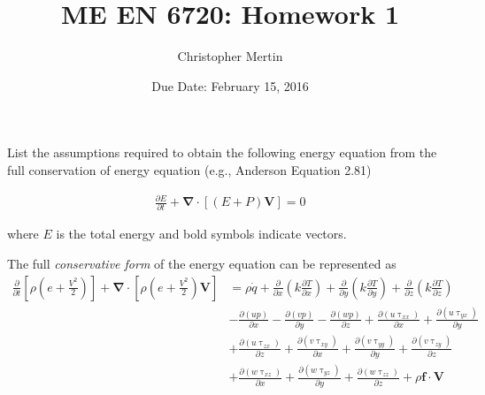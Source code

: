 \documentclass[addpoints]{exam}
\title{ME EN 6720: Homework 1}
\date{Due Date: February 15, 2016}
\author{Christopher Mertin}
\begin{document}
\maketitle

\pointname{}
\bonuspointname{}
\pointformat{[\bfseries\thepoints]}

\printanswers



\begin{questions}

List the assumptions required to obtain the following energy equation from the full conservation of energy equation (e.g., Anderson Equation 2.81)

\begin{align}
\frac{\partial E}{\partial t} + \bm{\nabla}\cdot [(E+P)\mathbf{V}] = 0\label{eq:simple}
\end{align}

where $E$ is the total energy and bold symbols indicate vectors.
\begin{solution}
The full {\em conservative form} of the energy equation can be represented as
\begin{align}
\frac{\partial}{\partial t}\left[\rho\left(e+\frac{V^{2}}{2}\right)\right]+\bm{\nabla}\cdot\left[\rho\left( e+\frac{V^{2}}{2}\right)\mathbf{V}\right] &= \rho\dot{q}+\frac{\partial}{\partial x}\left(k\frac{\partial T}{\partial x}\right)+\frac{\partial}{\partial y}\left( k\frac{\partial T}{\partial y}\right)+ \frac{\partial}{\partial z}\left( k\frac{\partial T}{\partial z}\right)\nonumber\\
&-\frac{\partial (up)}{\partial x}-\frac{\partial (vp)}{\partial y}-\frac{\partial (wp)}{\partial z}+\frac{\partial (u\uptau_{xx})}{\partial x}+\frac{\partial (u\uptau_{yx})}{\partial y}\nonumber\\
&+\frac{\partial (u\uptau_{zx})}{\partial z}+\frac{\partial (v\uptau_{xy})}{\partial x} +\frac{\partial (v\uptau_{yy})}{\partial y}+\frac{\partial (v\uptau_{zy})}{\partial z}\nonumber\\
&+\frac{\partial (w\uptau_{xz})}{\partial x}+\frac{\partial (w\uptau_{yz})}{\partial y}+\frac{\partial (w\uptau_{zz})}{\partial z}+\rho\bm{f}\cdot\mathbf{V} \label{eq:full}
\end{align}


\end{solution}
\end{questions}
\end{document}
